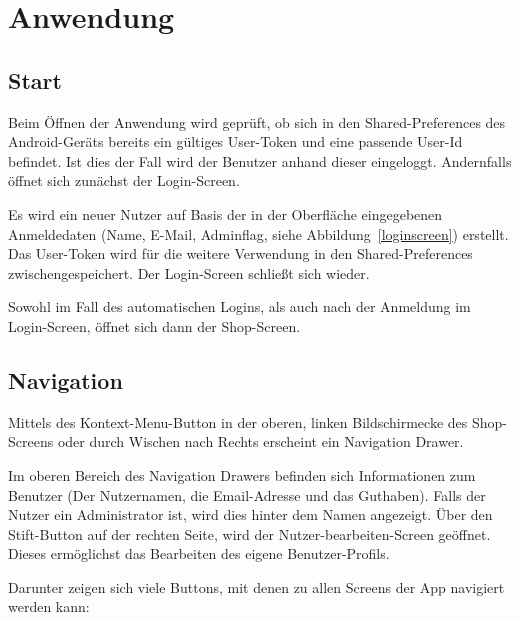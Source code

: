 \section{Anwendung}\label{sec:features}

\subsection{Start}\label{subsec:start}

Beim Öffnen der Anwendung wird geprüft, ob sich in den Shared-Preferences des Android-Geräts bereits ein gültiges User-Token und eine passende User-Id befindet.
Ist dies der Fall wird der Benutzer anhand dieser eingeloggt.
Andernfalls öffnet sich zunächst der Login-Screen.

Es wird ein neuer Nutzer auf Basis der in der Oberfläche eingegebenen Anmeldedaten (Name, E-Mail, Adminflag, siehe Abbildung~\ref{loginscreen}) erstellt.
Das User-Token wird für die weitere Verwendung in den Shared-Preferences zwischengespeichert.
Der Login-Screen schließt sich wieder.

Sowohl im Fall des automatischen Logins, als auch nach der Anmeldung im Login-Screen, öffnet sich dann der Shop-Screen.


\subsection{Navigation} \label{subsec:navigation}

Mittels des Kontext-Menu-Button in der oberen, linken Bildschirmecke des Shop-Screens oder durch Wischen nach Rechts erscheint ein Navigation Drawer.

Im oberen Bereich des Navigation Drawers befinden sich Informationen zum Benutzer (Der Nutzernamen, die Email-Adresse und das Guthaben).
Falls der Nutzer ein Administrator ist, wird dies hinter dem Namen angezeigt.
Über den Stift-Button auf der rechten Seite, wird der Nutzer-bearbeiten-Screen geöffnet.
Dieses ermöglichst das Bearbeiten des eigene Benutzer-Profils.

Darunter zeigen sich viele Buttons, mit denen zu allen Screens der App navigiert werden kann:


